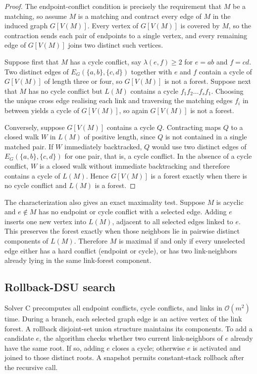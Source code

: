 \documentclass[smallextended,natbib,nospthms]{svjour3}
\theoremstyle{definition}
\theoremstyle{remark}
\newcommand{\bigO}{\mathcal{O}}
\begin{document}
\begin{proof}
The endpoint-conflict condition is precisely the requirement that $M$ be a
matching, so assume $M$ is a matching and contract every edge of $M$ in the
induced graph $G[V(M)]$. Every vertex of $G[V(M)]$ is covered by $M$, so the
contraction sends each pair of endpoints to a single vertex, and every
remaining edge of $G[V(M)]$ joins two distinct such vertices.

Suppose first that $M$ has a cycle conflict, say $\lambda(e,f)\geq 2$ for
$e=ab$ and $f=cd$. Two distinct edges of $E_G(\{a,b\},\{c,d\})$ together with
$e$ and $f$ contain a cycle of $G[V(M)]$ of length three or four, so
$G[V(M)]$ is not a forest. Suppose next that $M$ has no cycle conflict but
$L(M)$ contains a cycle $f_1f_2\ldots f_sf_1$. Choosing the unique cross edge
realising each link and traversing the matching edges $f_i$ in between yields
a cycle of $G[V(M)]$, so again $G[V(M)]$ is not a forest.

Conversely, suppose $G[V(M)]$ contains a cycle $Q$. Contracting maps $Q$ to a
closed walk $W$ in $L(M)$ of positive length, since $Q$ is not contained in a
single matched pair. If $W$ immediately backtracked, $Q$ would use two
distinct edges of $E_G(\{a,b\},\{c,d\})$ for one pair, that is, a cycle
conflict. In the absence of a cycle conflict, $W$ is a closed walk without
immediate backtracking and therefore contains a cycle of $L(M)$. Hence
$G[V(M)]$ is a forest exactly when there is no cycle conflict and $L(M)$ is a
forest.
\end{proof}

The characterization also gives an exact maximality test. Suppose $M$ is
acyclic and $e\notin M$ has no endpoint or cycle conflict with a selected edge.
Adding $e$ inserts one new vertex into $L(M)$, adjacent to all selected edges
linked to $e$. This preserves the forest exactly when those neighbors lie in
pairwise distinct components of $L(M)$. Therefore $M$ is maximal if and only
if every unselected edge either has a hard conflict (endpoint or cycle), or
has two link-neighbors already lying in the same link-forest component.

\subsection{Rollback-DSU search}

Solver C precomputes all endpoint conflicts, cycle conflicts, and links in
$\bigO(m^2)$ time. During a branch, each selected graph edge is an active
vertex of the link forest. A rollback disjoint-set union structure maintains
its components. To add a candidate $e$, the algorithm checks whether two
current link-neighbors of $e$ already have the same root. If so, adding $e$
closes a cycle; otherwise $e$ is activated and joined to those distinct roots.
A snapshot permits constant-stack rollback after the recursive call.
\end{document}
